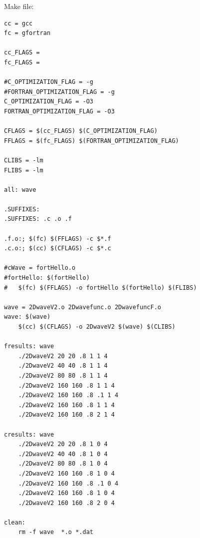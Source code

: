Make file:
\begin{lstlisting}[frame=single]
cc = gcc
fc = gfortran

cc_FLAGS = 
fc_FLAGS =  

#C_OPTIMIZATION_FLAG = -g
#FORTRAN_OPTIMIZATION_FLAG = -g
C_OPTIMIZATION_FLAG = -O3
FORTRAN_OPTIMIZATION_FLAG = -O3

CFLAGS = $(cc_FLAGS) $(C_OPTIMIZATION_FLAG)
FFLAGS = $(fc_FLAGS) $(FORTRAN_OPTIMIZATION_FLAG)

CLIBS = -lm
FLIBS = -lm

all: wave

.SUFFIXES:
.SUFFIXES: .c .o .f 

.f.o:; $(fc) $(FFLAGS) -c $*.f
.c.o:; $(cc) $(CFLAGS) -c $*.c

#cWave = fortHello.o
#fortHello: $(fortHello)
#	$(fc) $(FFLAGS) -o fortHello $(fortHello) $(FLIBS)

wave = 2DwaveV2.o 2Dwavefunc.o 2DwavefuncF.o
wave: $(wave)
	$(cc) $(CFLAGS) -o 2DwaveV2 $(wave) $(CLIBS)

fresults: wave
	./2DwaveV2 20 20 .8 1 1 4 
	./2DwaveV2 40 40 .8 1 1 4
	./2DwaveV2 80 80 .8 1 1 4
	./2DwaveV2 160 160 .8 1 1 4
	./2DwaveV2 160 160 .8 .1 1 4
	./2DwaveV2 160 160 .8 1 1 4
	./2DwaveV2 160 160 .8 2 1 4

cresults: wave
	./2DwaveV2 20 20 .8 1 0 4
	./2DwaveV2 40 40 .8 1 0 4
	./2DwaveV2 80 80 .8 1 0 4
	./2DwaveV2 160 160 .8 1 0 4
	./2DwaveV2 160 160 .8 .1 0 4
	./2DwaveV2 160 160 .8 1 0 4
	./2DwaveV2 160 160 .8 2 0 4

clean:  
	rm -f wave  *.o *.dat
	
	\end{lstlisting}

